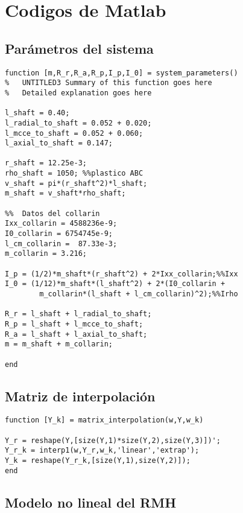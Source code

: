 \chapter{Codigos de Matlab}

\section{Par\'ametros del sistema}

\begin{lstlisting}[frame=single]
function [m,R_r,R_a,R_p,I_p,I_0] = system_parameters()
%	UNTITLED3 Summary of this function goes here
%   Detailed explanation goes here

l_shaft = 0.40;
l_radial_to_shaft = 0.052 + 0.020;
l_mcce_to_shaft = 0.052 + 0.060;
l_axial_to_shaft = 0.147;

r_shaft = 12.25e-3;
rho_shaft = 1050; %%plastico ABC
v_shaft = pi*(r_shaft^2)*l_shaft;
m_shaft = v_shaft*rho_shaft;

%%	Datos del collarin
Ixx_collarin = 4588236e-9;
I0_collarin = 6754745e-9;
l_cm_collarin =  87.33e-3;
m_collarin = 3.216;

I_p = (1/2)*m_shaft*(r_shaft^2) + 2*Ixx_collarin;%%Ixx
I_0 = (1/12)*m_shaft*(l_shaft^2) + 2*(I0_collarin + 
		m_collarin*(l_shaft + l_cm_collarin)^2);%%Irho

R_r = l_shaft + l_radial_to_shaft;
R_p = l_shaft + l_mcce_to_shaft;
R_a = l_shaft + l_axial_to_shaft;
m = m_shaft + m_collarin;

end
\end{lstlisting}

\section{Matriz de interpolaci\'on}

\begin{lstlisting}[frame=single]
function [Y_k] = matrix_interpolation(w,Y,w_k)

Y_r = reshape(Y,[size(Y,1)*size(Y,2),size(Y,3)])';
Y_r_k = interp1(w,Y_r,w_k,'linear','extrap');
Y_k = reshape(Y_r_k,[size(Y,1),size(Y,2)]);
end
\end{lstlisting}

\section{Modelo no lineal del RMH} \label{ap:sistema-ecuaciones-no-lineal}

